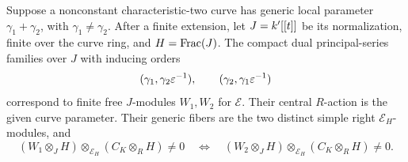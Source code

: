 \begin{lemma}\label{lem:principal-families}
Suppose a nonconstant characteristic-two curve has generic local
parameter \(\gamma_1+\gamma_2\), with \(\gamma_1\ne\gamma_2\). After a
finite extension, let \(J=k'[[t]]\) be its normalization, finite
over the curve ring, and
\(H=\operatorname{Frac}(J)\). The compact dual principal-series families over \(J\)
with inducing orders
\[
 (\gamma_1,\gamma_2\varepsilon^{-1}),\qquad
 (\gamma_2,\gamma_1\varepsilon^{-1})
\]
correspond to finite free \(J\)-modules \(W_1,W_2\) for
\(\mathcal E\). Their central \(R\)-action is the given curve parameter.
Their generic fibers are the two distinct simple right
\(\mathcal E_H\)-modules, and
\[
 (W_1\otimes_JH)\otimes_{\mathcal E_H}(C_K\otimes_RH)\ne0
 \quad\Longleftrightarrow\quad
 (W_2\otimes_JH)\otimes_{\mathcal E_H}(C_K\otimes_RH)\ne0.
\]
\end{lemma}
